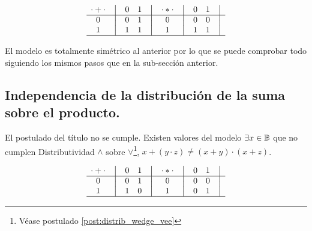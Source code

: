 \begin{equation}
    \begin{matrix}
        {\cdot + \cdot} & \big{\vert} & {0} & {1} & \big{\vert} \\
        \hline
        {0}             & \big{\vert} & {0} & {1} & \big{\vert} \\
        {1}             & \big{\vert} & {1} & {1} & \big{\vert} \\
        \hline
    \end{matrix}
    \quad
    \begin{matrix}
        {\cdot * \cdot} & \big{\vert} & {0} & {1} & \big{\vert} \\
        \hline
        {0}                   & \big{\vert} & {0} & {0} & \big{\vert} \\
        {1}                   & \big{\vert} & {1} & {1} & \big{\vert} \\
        \hline
    \end{matrix}
\end{equation}



	El modelo es totalmente simétrico al anterior por lo que se puede
comprobar todo siguiendo los mismos pasos que en la sub-sección anterior.



\subsection{Independencia de la distribución de la suma sobre el producto.}



	El postulado del título no se cumple. Existen valores del modelo \(
\exists x \in \mathbb{B} \) que no cumplen Distributividad $\wedge$ sobre $\vee$\footnote{Véase postulado \ref{post:distrib_wedge_vee}}, \( x + ( y \cdot z )
\neq ( x + y ) \cdot (x + z) \).



\begin{equation}
    \begin{matrix}
        {\cdot + \cdot} & \big{\vert} & {0} & {1} & \big{\vert} \\
        \hline
        {0}             & \big{\vert} & {0} & {1} & \big{\vert} \\
        {1}             & \big{\vert} & {1} & {0} & \big{\vert} \\
        \hline
    \end{matrix}
    \quad
    \begin{matrix}
        {\cdot * \cdot} & \big{\vert} & {0} & {1} & \big{\vert} \\
        \hline
        {0}                   & \big{\vert} & {0} & {0} & \big{\vert} \\
        {1}                   & \big{\vert} & {0} & {1} & \big{\vert} \\
        \hline
    \end{matrix}
\end{equation}




